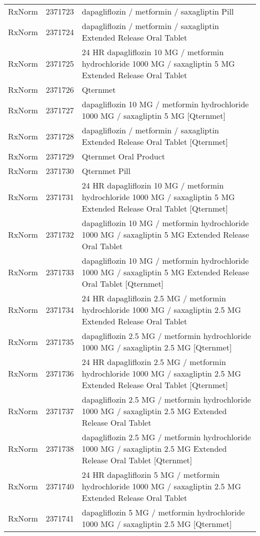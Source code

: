 \begin{longtable}{p{}p{}p{}}
  RxNorm & 2371723 & dapagliflozin / metformin / saxagliptin Pill \\ 
  RxNorm & 2371724 & dapagliflozin / metformin / saxagliptin Extended Release Oral Tablet \\ 
  RxNorm & 2371725 & 24 HR dapagliflozin 10 MG / metformin hydrochloride 1000 MG / saxagliptin 5 MG Extended Release Oral Tablet \\ 
  RxNorm & 2371726 & Qternmet \\ 
  RxNorm & 2371727 & dapagliflozin 10 MG / metformin hydrochloride 1000 MG / saxagliptin 5 MG [Qternmet] \\ 
  RxNorm & 2371728 & dapagliflozin / metformin / saxagliptin Extended Release Oral Tablet [Qternmet] \\ 
  RxNorm & 2371729 & Qternmet Oral Product \\ 
  RxNorm & 2371730 & Qternmet Pill \\ 
  RxNorm & 2371731 & 24 HR dapagliflozin 10 MG / metformin hydrochloride 1000 MG / saxagliptin 5 MG Extended Release Oral Tablet [Qternmet] \\ 
  RxNorm & 2371732 & dapagliflozin 10 MG / metformin hydrochloride 1000 MG / saxagliptin 5 MG Extended Release Oral Tablet \\ 
  RxNorm & 2371733 & dapagliflozin 10 MG / metformin hydrochloride 1000 MG / saxagliptin 5 MG Extended Release Oral Tablet [Qternmet] \\ 
  RxNorm & 2371734 & 24 HR dapagliflozin 2.5 MG / metformin hydrochloride 1000 MG / saxagliptin 2.5 MG Extended Release Oral Tablet \\ 
  RxNorm & 2371735 & dapagliflozin 2.5 MG / metformin hydrochloride 1000 MG / saxagliptin 2.5 MG [Qternmet] \\ 
  RxNorm & 2371736 & 24 HR dapagliflozin 2.5 MG / metformin hydrochloride 1000 MG / saxagliptin 2.5 MG Extended Release Oral Tablet [Qternmet] \\ 
  RxNorm & 2371737 & dapagliflozin 2.5 MG / metformin hydrochloride 1000 MG / saxagliptin 2.5 MG Extended Release Oral Tablet \\ 
  RxNorm & 2371738 & dapagliflozin 2.5 MG / metformin hydrochloride 1000 MG / saxagliptin 2.5 MG Extended Release Oral Tablet [Qternmet] \\ 
  RxNorm & 2371740 & 24 HR dapagliflozin 5 MG / metformin hydrochloride 1000 MG / saxagliptin 2.5 MG Extended Release Oral Tablet \\ 
  RxNorm & 2371741 & dapagliflozin 5 MG / metformin hydrochloride 1000 MG / saxagliptin 2.5 MG [Qternmet] \\ 

\end{longtable}
